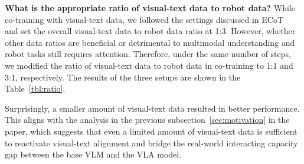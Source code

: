 \textbf{What is the appropriate ratio of visual-text data to robot data?}
While co-training with visual-text data, we followed the settings discussed in ECoT~\cite{ecot} and set the overall visual-text data to robot data ratio at 1:3. However, whether other data ratios are beneficial or detrimental to multimodal understanding and robot tasks still requires attention. Therefore, under the same number of steps, we modified the ratio of visual-text data to robot data in co-training to 1:1 and 3:1, respectively. The results of the three setups are shown in the Table~\ref{tbl:ratio}.
\begin{table*}[tb]
  \centering
  \caption{\textbf{Understanding task.} Evaluation of MLLMs and VLAs on 6 multimodal understanding benchmarks and 7 VQA benchmarks. We use bold to denote top-ranked methods, and underlined entries signify secondary performers.} 
  \label{tbl:ratio}
\end{table*}

Surprisingly, a smaller amount of visual-text data resulted in better performance. This aligns with the analysis in the previous subsection~\ref{sec:motivation} in the paper, which suggests that even a limited amount of visual-text data is sufficient to reactivate visual-text alignment and bridge the real-world interacting capacity gap between the base VLM and the VLA model.

